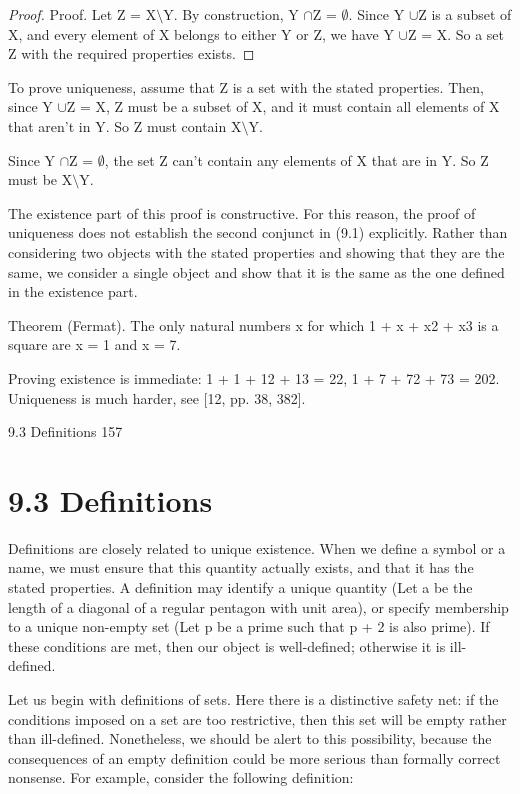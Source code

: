 \documentclass[11pt]{article}
\theoremstyle{plain}
\theoremstyle{definition}
\begin{document}
\begin{proof}
Proof. Let Z = X$\setminus$Y. By construction, Y $\cap$Z = $\emptyset$. Since Y $\cup$Z is a subset of X, and every element of X belongs to either Y or Z, we have Y $\cup$Z = X. So a set Z with the required properties exists.
\end{proof}

To prove uniqueness, assume that Z is a set with the stated properties. Then, since Y $\cup$Z = X, Z must be a subset of X, and it must contain all elements of X that aren't in Y. So Z must contain X$\setminus$Y.

Since Y $\cap$Z = $\emptyset$, the set Z can't contain any elements of X that are in Y. So Z must be X$\setminus$Y. 

The existence part of this proof is constructive. For this reason, the proof of uniqueness does not establish the second conjunct in (9.1) explicitly. Rather than considering two objects with the stated properties and showing that they are the same, we consider a single object and show that it is the same as the one defined in the existence part.

Theorem (Fermat). The only natural numbers x for which 1 + x + x2 + x3 is a square are x = 1 and x = 7.

Proving existence is immediate: 1 + 1 + 12 + 13 = 22, 1 + 7 + 72 + 73 = 202. Uniqueness is much harder, see [12, pp. 38, 382].

9.3 Definitions 157

\section{9.3 Definitions}

Definitions are closely related to unique existence. When we define a symbol or a name, we must ensure that this quantity actually exists, and that it has the stated properties. A definition may identify a unique quantity (Let a be the length of a diagonal of a regular pentagon with unit area), or specify membership to a unique non-empty set (Let p be a prime such that p + 2 is also prime). If these conditions are met, then our object is well-defined; otherwise it is ill-defined.

Let us begin with definitions of sets. Here there is a distinctive safety net: if the conditions imposed on a set are too restrictive, then this set will be empty rather than ill-defined. Nonetheless, we should be alert to this possibility, because the consequences of an empty definition could be more serious than formally correct nonsense. For example, consider the following definition:
\end{document}
